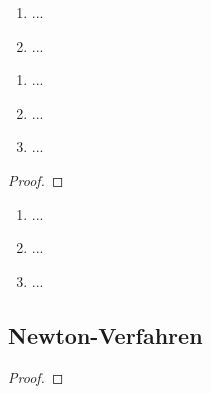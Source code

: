 \documentclass[12pt]{scrreprt}
\begin{document}
\begin{dfn}\label{}

\end{dfn}

\begin{bem}\label{}
\begin{enumerate}
\item ...
\item ...
\end{enumerate}
\end{bem}

\begin{thm}\label{}
\begin{enumerate}
\item ...
\item ...
\item ...
\end{enumerate}
\end{thm}
\begin{bsp*}

\end{bsp*}
\begin{proof}

\end{proof}

\begin{dfn}\label{}

\end{dfn}

\begin{bsp}\label{}
\begin{enumerate}
\item ...
\item ...
\item ...
\end{enumerate}
\end{bsp}

\subsection*{Newton-Verfahren}

\begin{thm}\label{}

\end{thm}
\begin{proof}

\end{proof}

\begin{bsp}\label{}

\end{bsp}
\end{document}
